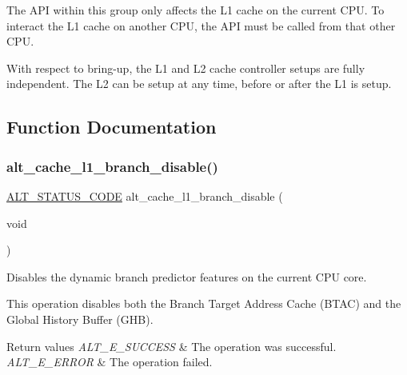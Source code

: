 The A\+PI within this group only affects the L1 cache on the current C\+PU. To interact the L1 cache on another C\+PU, the A\+PI must be called from that other C\+PU.

With respect to bring-\/up, the L1 and L2 cache controller setups are fully independent. The L2 can be setup at any time, before or after the L1 is setup. 

\subsection{Function Documentation}
\mbox{\label{group__CACHE__L1_gaf1dad3fa0be0a3b73b6d1b1709c6c968}} 
\subsubsection{\texorpdfstring{alt\_cache\_l1\_branch\_disable()}{alt\_cache\_l1\_branch\_disable()}}
{\footnotesize\ttfamily \mbox{\hyperlink{hwlib_8h_abdb0d369f069723ca55d6c94bcaaaa12}{A\+L\+T\+\_\+\+S\+T\+A\+T\+U\+S\+\_\+\+C\+O\+DE}} alt\+\_\+cache\+\_\+l1\+\_\+branch\+\_\+disable (\begin{DoxyParamCaption}\item[{void}]{ }\end{DoxyParamCaption})}

Disables the dynamic branch predictor features on the current C\+PU core.

This operation disables both the Branch Target Address Cache (B\+T\+AC) and the Global History Buffer (G\+HB).


\begin{DoxyRetVals}{Return values}
{\em A\+L\+T\+\_\+\+E\+\_\+\+S\+U\+C\+C\+E\+SS} & The operation was successful. \\
\hline
{\em A\+L\+T\+\_\+\+E\+\_\+\+E\+R\+R\+OR} & The operation failed. \\
\hline
\end{DoxyRetVals}
\mbox{\label{group__CACHE__L1_ga4fc796e78302b0717838a92a0a922678}} 
